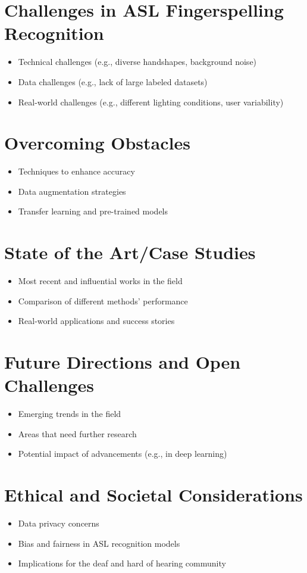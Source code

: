 \section{Challenges in ASL Fingerspelling Recognition}
\begin{itemize}
    \item Technical challenges (e.g., diverse handshapes, background noise)
    \item Data challenges (e.g., lack of large labeled datasets)
    \item Real-world challenges (e.g., different lighting conditions, user variability)
\end{itemize}

\section{Overcoming Obstacles}
\begin{itemize}
    \item Techniques to enhance accuracy
    \item Data augmentation strategies
    \item Transfer learning and pre-trained models
\end{itemize}

\section{State of the Art/Case Studies}
\begin{itemize}
    \item Most recent and influential works in the field
    \item Comparison of different methods' performance
    \item Real-world applications and success stories
\end{itemize}

\section{Future Directions and Open Challenges}
\begin{itemize}
    \item Emerging trends in the field
    \item Areas that need further research
    \item Potential impact of advancements (e.g., in deep learning)
\end{itemize}

\section{Ethical and Societal Considerations}
\begin{itemize}
    \item Data privacy concerns
    \item Bias and fairness in ASL recognition models
    \item Implications for the deaf and hard of hearing community

\end{itemize}

